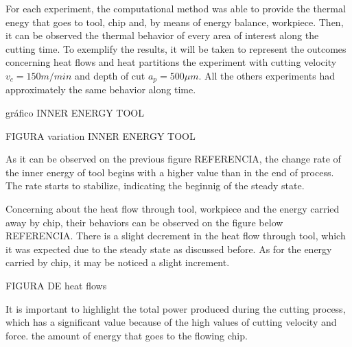 	For each experiment, the computational method was able to provide the thermal enegy that goes to tool, chip and, by means of energy balance, workpiece. Then, it can be observed the thermal behavior of every area of interest along the cutting time.
	To exemplify the results, it will be taken to represent the outcomes concerning heat flows and heat partitions the experiment with cutting velocity $v_{c} = 150 m/min$ and depth of cut $a_{p} = 500 \mu m$. All the others experiments had approximately the same behavior along time.

	gráfico INNER ENERGY TOOL

	FIGURA variation INNER ENERGY TOOL

	As it can be observed on the previous figure REFERENCIA, the change rate of the inner energy of tool begins with a higher value than in the end of process. The rate starts to stabilize, indicating the beginnig of the steady state. 

	Concerning about the heat flow through tool, workpiece and the energy carried away by chip, their behaviors can be observed on the figure below REFERENCIA. There is a slight decrement in the heat flow through tool, which it was expected due to the steady state as discussed before. As for the energy carried by chip, it may be noticed a slight increment.

	FIGURA DE heat flows

	It is important to highlight the total power produced during the cutting process, which has a significant value because of the high values of cutting velocity and force.  the amount of energy that goes to the flowing chip.





	
